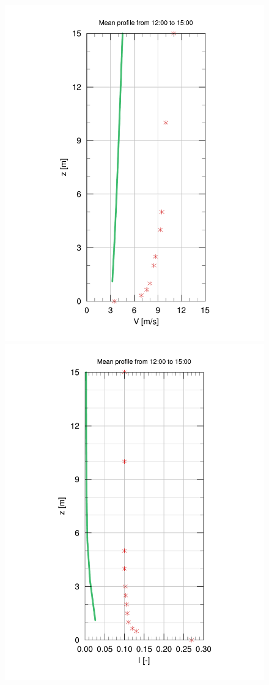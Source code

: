\begin{figure}[H]
	\begin{minipage}{0.5\linewidth}
	\end{minipage}%
	\begin{minipage}{0.5\linewidth}
	\end{minipage}%
	
	\begin{minipage}{0.5\linewidth}
		\centering
		\includegraphics[width=0.7\linewidth,trim={4.5cm 12mm 4.3cm 20mm},clip]{Imagenes/06/bol_da/V_referencia}%
	\end{minipage}%
	\begin{minipage}{0.5\linewidth}
		\centering
		\includegraphics[width=0.7\linewidth,trim={4.5cm 12mm 4.3cm 20mm},clip]{Imagenes/06/bol_da/tke_referencia}%
	\end{minipage}%
	

\end{figure}
